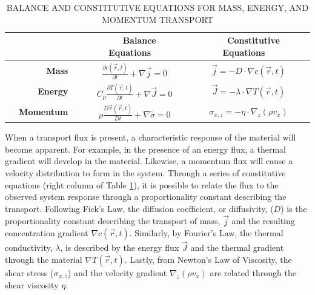 \begin{table}
	\caption{BALANCE AND CONSTITUTIVE EQUATIONS FOR MASS, ENERGY, AND MOMENTUM TRANSPORT\label{tab:transport}}
        \begin{tabular}{rcc}
          \hline \hline
          & \textbf{~~Balance Equations~~} & \textbf{~~Constitutive Equations~~}\\ \hline 
          \textbf{~~Mass~~} & $\frac{\partial c (\vec{r}, t)}{\partial t} + \nabla \vec{j} = 0$ & $\vec{j} = -D \cdot \nabla c(\vec{r}, t)$\\
          \textbf{~~Energy~~} & $C_p \frac{\partial T (\vec{r}, t)}{\partial t} + \nabla \vec{J} = 0$ & $\vec{J} = -\lambda \cdot \nabla T(\vec{r}, t)$\\
          \textbf{~~Momentum~~} & $\rho \frac{D \vec{v}(\vec{r}, t)}{Dt}
                                  + \nabla \overleftrightarrow{\sigma} =
                                  0$ & $\sigma_{x,z} = -\eta \cdot
                                       \nabla_z (\rho v_x)$\\ \hline
          \hline
          \end{tabular}
\end{table}

When a transport flux is present, a characteristic response of the
material will become apparent. For example, in the presence of an
energy flux, a thermal gradient will develop in the
material. Likewise, a momentum flux will cause a velocity distribution
to form in the system. Through a series of constitutive equations
(right column of Table \ref{tab:transport}), it is possible to relate
the flux to the observed system response through a proportionality
constant describing the transport.  Following Fick's Law, the
diffusion coefficient, or diffusivity, ($D$) is the proportionality
constant describing the transport of mass, $\vec{j}$ and the resulting
concentration gradient $\nabla c(\vec{r}, t)$. Similarly, by Fourier's
Law, the thermal conductivity, $\lambda$, is described by the energy
flux $\vec{J}$ and the thermal gradient through the material
$\nabla T(\vec{r}, t)$. Lastly, from Newton's Law of Viscosity, the
shear stress ($\sigma_{x,z}$) and the velocity gradient
$\nabla_z (\rho v_x)$ are related through the shear viscosity
$\eta$. 


